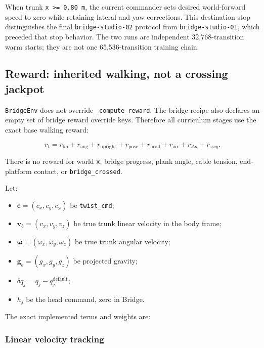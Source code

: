 \documentclass[
  american,
  11pt,
  letterpaper,
]{article}
\providecommand{\tightlist}{%
  \setlength{\itemsep}{0pt}\setlength{\parskip}{0pt}}
\begin{document}
When trunk \texttt{x\ \textgreater{}=\ 0.80\ m}, the current commander
sets desired world-forward speed to zero while retaining lateral and yaw
corrections. This destination stop distinguishes the final
\texttt{bridge-\allowbreak{}studio-\allowbreak{}02} protocol from
\texttt{bridge-\allowbreak{}studio-\allowbreak{}01}, which preceded that
stop behavior. The two runs are independent 32,768-transition warm
starts; they are not one 65,536-transition training chain.

\subsection{Reward: inherited walking, not a crossing
jackpot}\label{reward-inherited-walking-not-a-crossing-jackpot}

\texttt{BridgeEnv} does not override
\texttt{\_\allowbreak{}compute\_\allowbreak{}reward}. The bridge recipe
also declares an empty set of bridge reward override keys. Therefore all
curriculum stages use the exact base walking reward:

\[
r_t=
r_{\text{lin}}+
r_{\text{ang}}+
r_{\text{upright}}+
r_{\text{pose}}+
r_{\text{head}}+
r_{\text{air}}+
r_{\Delta a}+
r_{\omega xy}.
\]

There is no reward for world \texttt{x}, bridge progress, plank angle,
cable tension, end-platform contact, or
\texttt{bridge\_\allowbreak{}crossed}.

Let:

\begin{itemize}
\tightlist
\item
  \(\mathbf c=(c_x,c_y,c_\omega)\) be \texttt{twist\_cmd};
\item
  \(\mathbf v_b=(v_x,v_y,v_z)\) be true trunk linear velocity in the
  body frame;
\item
  \(\boldsymbol\omega=(\omega_x,\omega_y,\omega_z)\) be true trunk
  angular velocity;
\item
  \(\mathbf g_b=(g_x,g_y,g_z)\) be projected gravity;
\item
  \(\delta q_j=q_j-q_j^{\text{default}}\);
\item
  \(h_j\) be the head command, zero in Bridge.
\end{itemize}

The exact implemented terms and weights are:

\subsubsection{Linear velocity tracking}\label{linear-velocity-tracking}
\end{document}
